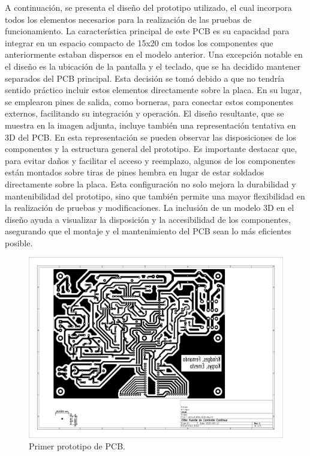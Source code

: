 A continuación, se presenta el diseño del prototipo utilizado, el cual incorpora todos los elementos necesarios para la realización de las pruebas de funcionamiento. La característica principal de este PCB es su capacidad para integrar en un espacio compacto de 15x20 cm todos los componentes que anteriormente estaban dispersos en el modelo anterior.
Una excepción notable en el diseño es la ubicación de la pantalla y el teclado, que se ha decidido mantener separados del PCB principal. Esta decisión se tomó debido a que no tendría sentido práctico incluir estos elementos directamente sobre la placa. En su lugar, se emplearon pines de salida, como borneras, para conectar estos componentes externos, facilitando su integración y operación.
El diseño resultante, que se muestra en la imagen adjunta, incluye también una representación tentativa en 3D del PCB. En esta representación se pueden observar las disposiciones de los componentes y la estructura general del prototipo. Es importante destacar que, para evitar daños y facilitar el acceso y reemplazo, algunos de los componentes están montados sobre tiras de pines hembra en lugar de estar soldados directamente sobre la placa. Esta configuración no solo mejora la durabilidad y mantenibilidad del prototipo, sino que también permite una mayor flexibilidad en la realización de pruebas y modificaciones. La inclusión de un modelo 3D en el diseño ayuda a visualizar la disposición y la accesibilidad de los componentes, asegurando que el montaje y el mantenimiento del PCB sean lo más eficientes posible.
\begin{figure}[H]
    \centering
    \includegraphics[scale=0.5]{./imagenes/pcb_v1.jpg}
    \caption{Primer prototipo de PCB.}
    \label{F:PCB_V1}
\end{figure}
